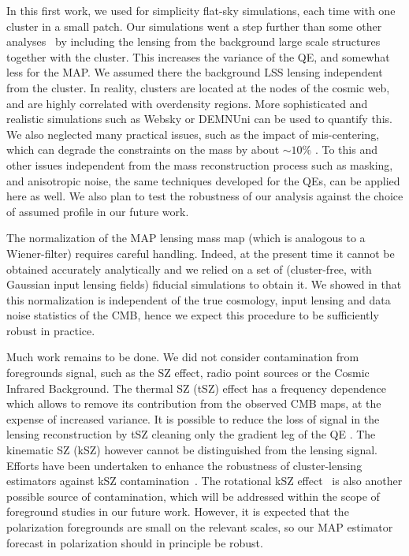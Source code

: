\documentclass[prd, superscriptaddress, tightenlines, longbibliography, nofootinbib, eqsecnum, amsfonts, amsmath, floatfix, twocolumn, notitlepage]{revtex4-2}
\newcommand{\bb}[1]{\textcolor{teal}{#1}}
\begin{document}
In this first work, we used for simplicity flat-sky simulations, each time with one cluster in a small patch. Our simulations went a step further than some other analyses~\cite{Raghunathan:2017cle} by including the lensing from the background large scale structures together with the cluster. This increases the variance of the QE, and somewhat less for the MAP. We assumed there the background LSS lensing independent from the cluster. In reality, clusters are located at the nodes of the cosmic web, and are highly correlated with overdensity regions. More sophisticated and realistic simulations such as Websky \cite{Stein:2020its} or DEMNUni \cite{Carbone:2016nzj} can be used to quantify this. We also neglected many practical issues, such as the impact of mis-centering, which can degrade the constraints on the mass by about $\sim 10\%$ \cite{Madhavacheril:2017onh, Zubeldia:2019brr}. To this and other issues independent from the mass reconstruction process such as masking, and anisotropic noise, the same techniques developed for the QEs, can be applied here as well. We also plan to test the robustness of our analysis against the choice of assumed profile in our future work.


The normalization of the MAP lensing mass map (which is analogous to a Wiener-filter) requires careful handling. Indeed, at the present time it cannot be obtained accurately analytically and we relied on a set of (cluster-free, with Gaussian input lensing fields) fiducial simulations to obtain it. We showed in \cite{Legrand:2021qdu} that this normalization is independent of the true cosmology, input lensing and data noise statistics of the CMB, hence we expect this procedure to be sufficiently robust in practice. \bb{}

Much work remains to be done. We did not consider contamination from foregrounds signal, such as the SZ effect, radio point sources or the Cosmic Infrared Background. The thermal SZ (tSZ) effect has a frequency dependence which allows to remove its contribution from the observed CMB maps, at the expense of increased variance. It is possible to reduce the loss of signal in the lensing reconstruction by tSZ cleaning only the gradient leg of the QE \cite{Madhavacheril:2018bxi, DES:2018myw, Patil_2020}. The kinematic SZ (kSZ) however cannot be distinguished from the lensing signal. Efforts have been undertaken to enhance the robustness of cluster-lensing estimators against kSZ contamination~\cite{Raghunathan:2019tsz, Levy:2023moy}.  The rotational kSZ effect~\cite{Baxter:2019tze} is also another possible source of contamination, which will be addressed within the scope of foreground studies in our future work. However, it is expected that the polarization foregrounds are small on the relevant scales, so our MAP estimator forecast in polarization should in principle be robust.
\end{document}
